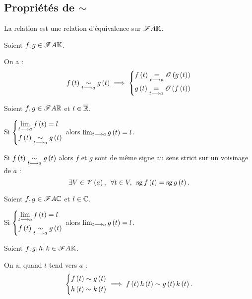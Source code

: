 \subsection{Propriétés de \(\sim\)}

\begin{prop}
La relation  est une relation d'équivalence sur \(\mathscr{F}{A}{\mathbb{K}}\).
\end{prop}

\begin{prop}
Soient \(f,g\in\mathscr{F}{A}{\mathbb{K}}\).

On a : \[f\left(t\right)\underset{t\longrightarrow a}{\sim}g\left(t\right)\implies\begin{dcases}
    f\left(t\right)\underset{t\longrightarrow a}{=}\mathscr{O}\left(g\left(t\right)\right) \\
    g\left(t\right)\underset{t\longrightarrow a}{=}\mathscr{O}\left(f\left(t\right)\right)
\end{dcases}\]
\end{prop}

\begin{prop}
Soient \(f,g\in\mathscr{F}{A}{\mathbb{R}}\) et \(l\in\overline{\mathbb{R}}\).

Si \(\begin{dcases}
    \lim_{t\longrightarrow a}f\left(t\right)=l \\
    f\left(t\right)\underset{t\longrightarrow a}{\sim}g\left(t\right)
\end{dcases}\) alors \(\lim_{t\longrightarrow a}g\left(t\right)=l\).

Si \(f\left(t\right)\underset{t\longrightarrow a}{\sim}g\left(t\right)\) alors \(f\) et \(g\) sont de même signe au sens strict sur un voisinage de \(a\) : \[\quantifs{\exists V\in\V{a};\forall t\in V}\sg f\paren{t}=\sg g\paren{t}.\]
\end{prop}

\begin{prop}
Soient \(f,g\in\mathscr{F}{A}{\mathbb{C}}\) et \(l\in\mathbb{C}\).

Si \(\begin{dcases}
\lim_{t\longrightarrow a}f\left(t\right)=l \\
f\left(t\right)\underset{t\longrightarrow a}{\sim}g\left(t\right)
\end{dcases}\) alors \(\lim_{t\longrightarrow a}g\left(t\right)=l\).
\end{prop}

\begin{prop}[Produits]
Soient \(f,g,h,k\in\mathscr{F}{A}{\mathbb{K}}\).

On a, quand \(t\) tend vers \(a\) : \[\begin{dcases}
f\left(t\right)\sim g\left(t\right) \\
h\left(t\right)\sim k\left(t\right)
\end{dcases}\implies f\left(t\right)h\left(t\right)\sim g\left(t\right)k\left(t\right).\]
\end{prop}

